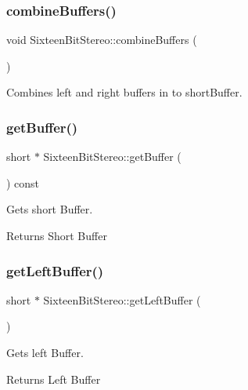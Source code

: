 \subsubsection{\texorpdfstring{combine\+Buffers()}{combineBuffers()}}
{\footnotesize\ttfamily void Sixteen\+Bit\+Stereo\+::combine\+Buffers (\begin{DoxyParamCaption}{ }\end{DoxyParamCaption})}

Combines left and right buffers in to short\+Buffer. \mbox{\label{classSixteenBitStereo_a33d3535a8b8153adc232fac28d83b554}} 
\subsubsection{\texorpdfstring{get\+Buffer()}{getBuffer()}}
{\footnotesize\ttfamily short $\ast$ Sixteen\+Bit\+Stereo\+::get\+Buffer (\begin{DoxyParamCaption}{ }\end{DoxyParamCaption}) const}

Gets short Buffer. \begin{DoxyReturn}{Returns}
Short Buffer 
\end{DoxyReturn}
\mbox{\label{classSixteenBitStereo_a7f32d58142b5a0b0f2f3f6a3966d3123}} 
\subsubsection{\texorpdfstring{get\+Left\+Buffer()}{getLeftBuffer()}}
{\footnotesize\ttfamily short $\ast$ Sixteen\+Bit\+Stereo\+::get\+Left\+Buffer (\begin{DoxyParamCaption}{ }\end{DoxyParamCaption})}

Gets left Buffer. \begin{DoxyReturn}{Returns}
Left Buffer 
\end{DoxyReturn}
\mbox{\label{classSixteenBitStereo_a1650df261c08a181004fe08fdf116bde}} 
